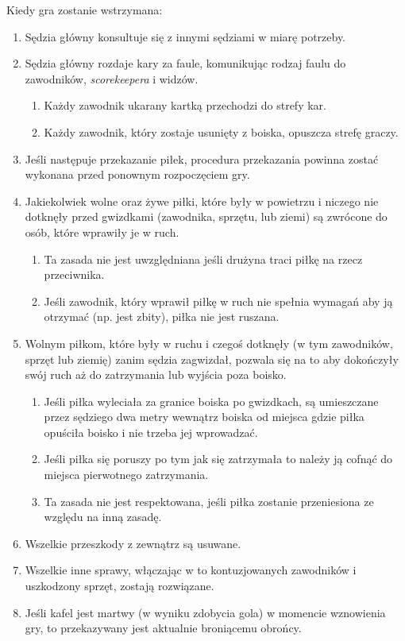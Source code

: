 \documentclass[11pt,a4paper]{article}
\begin{document}
Kiedy gra zostanie wstrzymana:

\begin{enumerate}

\item
  Sędzia główny konsultuje się z innymi sędziami w miarę potrzeby.
\item
  Sędzia główny rozdaje kary za faule, komunikując rodzaj faulu do
  zawodników, \emph{scorekeepera} i widzów.

  \begin{enumerate}
  
  \item
    Każdy zawodnik ukarany kartką przechodzi do strefy kar.
  \item
    Każdy zawodnik, który zostaje usunięty z boiska, opuszcza strefę
    graczy.
  \end{enumerate}
\item
  Jeśli następuje przekazanie piłek, procedura przekazania powinna
  zostać wykonana przed ponownym rozpoczęciem gry.
\item
  Jakiekolwiek wolne oraz żywe piłki, które były w powietrzu i niczego
  nie dotknęły przed gwizdkami (zawodnika, sprzętu, lub ziemi) są
  zwrócone do osób, które wprawiły je w ruch.

  \begin{enumerate}
  
  \item
    Ta zasada nie jest uwzględniana jeśli drużyna traci piłkę na rzecz
    przeciwnika.
  \item
    Jeśli zawodnik, który wprawił piłkę w ruch nie spełnia wymagań aby
    ją otrzymać (np. jest zbity), piłka nie jest ruszana.
  \end{enumerate}
\item
  Wolnym piłkom, które były w ruchu i czegoś dotknęły (w tym zawodników,
  sprzęt lub ziemię) zanim sędzia zagwizdał, pozwala się na to aby
  dokończyły swój ruch aż do zatrzymania lub wyjścia poza boisko.

  \begin{enumerate}
  
  \item
    Jeśli piłka wyleciała za granice boiska po gwizdkach, są umieszczane
    przez sędziego dwa metry wewnątrz boiska od miejsca gdzie piłka
    opuściła boisko i nie trzeba jej wprowadzać.
  \item
    Jeśli piłka się poruszy po tym jak się zatrzymała to należy ją
    cofnąć do miejsca pierwotnego zatrzymania.
  \item
    Ta zasada nie jest respektowana, jeśli piłka zostanie przeniesiona
    ze względu na inną zasadę.
  \end{enumerate}
\item
  Wszelkie przeszkody z zewnątrz są usuwane.
\item
  Wszelkie inne sprawy, włączając w to kontuzjowanych zawodników i
  uszkodzony sprzęt, zostają rozwiązane.
\item
  Jeśli kafel jest martwy (w wyniku zdobycia gola) w momencie wznowienia
  gry, to przekazywany jest aktualnie broniącemu obrońcy.
\end{enumerate}
\end{document}
